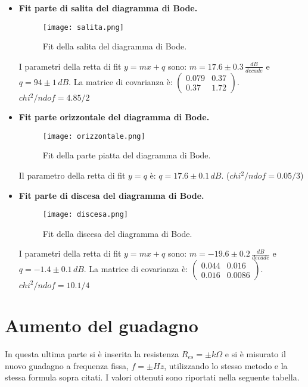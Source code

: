 \documentclass[10pt,a4paper]{article}
\begin{document}
\begin{itemize}
\item \textbf{Fit parte di salita del diagramma di Bode.}

\begin{figure}[!htb]
  \centering
  \texttt{[image: salita.png]}
\caption{Fit della salita del diagramma di Bode.}
\label{salita}
\end{figure}

I parametri della retta di fit $y = mx+q$ sono: $m = 17.6 \pm 0.3 \, \frac{dB}{decade}$ e $q = 94 \pm 1 \, dB$. La matrice di covarianza è:
$\left( \begin{array}{cc}
0.079 & 0.37 \\ 
0.37 & 1.72
\end{array} \right)$.\\
$chi^2/ndof = 4.85/2$

\item \textbf{Fit parte orizzontale del diagramma di Bode.}

\begin{figure}[!htb]
  \centering
  \texttt{[image: orizzontale.png]}
\caption{Fit della parte piatta del diagramma di Bode.}
\label{orizz}
\end{figure}



Il parametro della retta di fit $y = q$ è: $q = 17.6 \pm 0.1 \, dB$. ($chi^2/ndof = 0.05/3$)

\item \textbf{Fit parte di discesa del diagramma di Bode.}

\begin{figure}[!htb]
  \centering
  \texttt{[image: discesa.png]}
\caption{Fit della discesa del diagramma di Bode.}
\label{discesa}
\end{figure}

I parametri della retta di fit $y = mx+q$ sono: $m = -19.6 \pm 0.2 \, \frac{dB}{decade}$ e $q = -1.4 \pm 0.1 \, dB$. La matrice di covarianza è:
$\left( \begin{array}{cc}
0.044 & 0.016 \\ 
0.016 & 0.0086
\end{array} \right)
$.\\
$chi^2/ndof = 10.1/4$

\end{itemize}


\section{Aumento del guadagno}
In questa ultima parte si è inserita la resistenza $R_{es}= \pm k\Omega$ e si è misurato il nuovo guadagno a frequenza fissa, $f= \pm Hz$, utilizzando lo stesso metodo e la stessa formula sopra citati. I valori ottenuti sono riportati nella seguente tabella.
\end{document}
